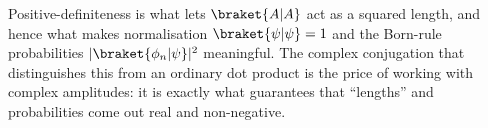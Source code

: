 \begin{insightbox}
Positive-definiteness is what lets $\braket{A|A}$ act as a squared length, and hence what makes normalisation $\braket{\psi|\psi}=1$ and the Born-rule probabilities $|\braket{\phi_n|\psi}|^2$ meaningful. The complex conjugation that distinguishes this from an ordinary dot product is the price of working with complex amplitudes: it is exactly what guarantees that ``lengths'' and probabilities come out real and non-negative.
\end{insightbox}
